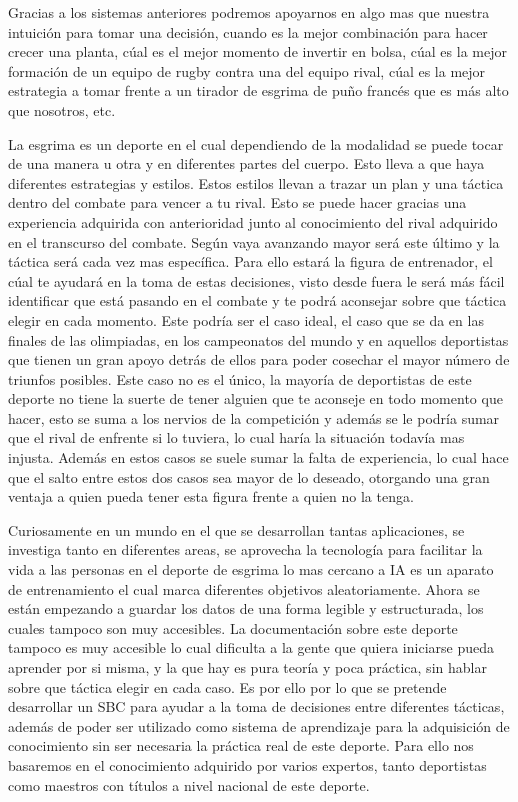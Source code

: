 \documentclass[11pt,a4paper,twoside,final]{article}
\begin{document}
\smallskip
Gracias a los sistemas anteriores podremos apoyarnos en algo mas que nuestra intuición para tomar una decisión, cuando es la mejor combinación para hacer crecer una planta,
 cúal es el mejor momento de invertir en bolsa, cúal es la mejor formación de un equipo de rugby contra una del equipo rival, cúal es la mejor estrategia a tomar frente a un tirador de esgrima
 de puño francés que es más alto que nosotros, etc.

\bigskip
La esgrima es un deporte en el cual dependiendo de la modalidad se puede tocar de una manera u otra y en diferentes partes del cuerpo. Esto lleva a que haya diferentes estrategias
 y estilos. Estos estilos llevan a trazar un plan y una táctica dentro del combate para vencer a tu rival. Esto se puede hacer gracias una experiencia adquirida con anterioridad
 junto al conocimiento del rival adquirido en el transcurso del combate. Según vaya avanzando mayor será este último y la táctica será cada vez mas específica. Para ello
 estará la figura de entrenador, el cúal te ayudará en la toma de estas decisiones, visto desde fuera le será más fácil identificar que está pasando en el combate y te podrá
 aconsejar sobre que táctica elegir en cada momento. Este podría ser el caso ideal, el caso que se da en las finales de las olimpiadas, en los campeonatos del mundo y en aquellos
 deportistas que tienen un gran apoyo detrás de ellos para poder cosechar el mayor número de triunfos posibles. Este caso no es el único, la mayoría de deportistas de este deporte
 no tiene la suerte de tener alguien que te aconseje en todo momento que hacer, esto se suma a los nervios de la competición y además se le podría sumar que el rival de enfrente
 si lo tuviera, lo cual haría la situación todavía mas injusta. Además en estos casos se suele sumar la falta de experiencia, lo cual hace que el salto entre estos dos casos sea
 mayor de lo deseado, otorgando una gran ventaja a quien pueda tener esta figura frente a quien no la tenga.

\bigskip
Curiosamente en un mundo en el que se desarrollan tantas aplicaciones, se investiga tanto en diferentes areas, se aprovecha la tecnología para facilitar la vida a las personas
 en el deporte de esgrima lo mas cercano a IA es un aparato de entrenamiento el cual marca diferentes objetivos aleatoriamente. Ahora se están empezando a guardar los datos de
 una forma legible y estructurada, los cuales tampoco son muy accesibles. La documentación sobre este deporte tampoco es muy accesible lo cual dificulta a la gente
 que quiera iniciarse pueda aprender por si misma, y la que hay es pura teoría y poca práctica, sin hablar sobre que táctica elegir en cada caso. Es por ello por lo que se pretende
 desarrollar un SBC para ayudar a la toma de decisiones entre diferentes tácticas, además de poder ser utilizado como sistema de aprendizaje para la adquisición de conocimiento
 sin ser necesaria la práctica real de este deporte. Para ello nos basaremos en el conocimiento adquirido por varios expertos, tanto deportistas como maestros con títulos a nivel
 nacional de este deporte.
\end{document}
